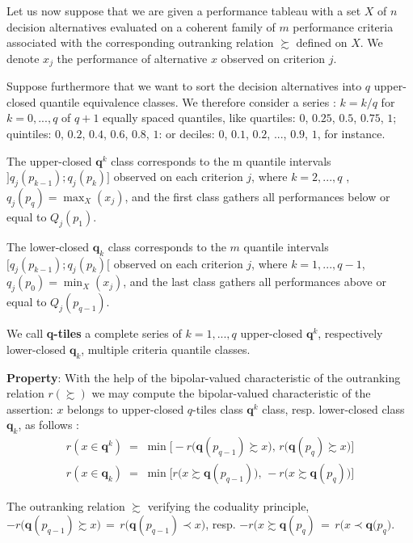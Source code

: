 Let us now suppose that we are given a performance tableau with a set $X$ of $n$ decision alternatives evaluated on a coherent family of $m$ performance criteria associated with the corresponding outranking relation $\succsim$ defined on $X$. We denote $x_j$ the performance of alternative $x$ observed on criterion $j$.

Suppose furthermore that we want to sort the decision alternatives into $q$ upper-closed quantile equivalence classes. We therefore consider a series : $k = k/q$ for $k = 0, ..., q$ of $q+1$ equally spaced quantiles, like quartiles: $0$, $0.25$, $0.5$, $0.75$, $1$; quintiles: $0$, $0.2$, $0.4$, $0.6$, $0.8$, $1$: or deciles: $0$, $0.1$, $0.2$, ..., $0.9$, $1$, for instance.

The upper-closed $\mathbf{q}^k$ class corresponds to the m quantile intervals $]q_j(p_{k-1});q_j(p_k)]$ observed on each criterion $j$,  where $k = 2, ..., q$ , $q_j(p_q) =  \max_X(x_j)$, and the first class gathers all performances below or equal to $Q_j(p_1)$.

The lower-closed $\mathbf{q}_k$ class corresponds to the $m$ quantile intervals $[q_j(p_{k-1});q_j(p_k)[$ observed on each criterion $j$, where $k = 1, ..., q-1$, $q_j(p_0) = \min_X(x_j)$, and the last class gathers all performances above or equal to $Q_j(p_{q-1})$.

We call \textbf{q-tiles} a complete series of $k = 1, ..., q$ upper-closed $\mathbf{q}^k$, respectively lower-closed $\mathbf{q}_k$, multiple criteria quantile classes.

\textbf{Property}: With the help of the bipolar-valued characteristic of the outranking relation $r(\succsim)$ we may compute the bipolar-valued characteristic of the assertion: $x$ belongs to upper-closed $q$-tiles class $\mathbf{q}^k$ class, resp. lower-closed class $\mathbf{q}_k$, as follows \citep{BIS-2016} :
\begin{eqnarray}\label{eq:9.1}
r(x \in \mathbf{q}^k) \; = \; \min \big[ -r\big(\mathbf{q}(p_{q-1}) \succsim x\big), \,r\big(\mathbf{q}(p_{q}) \succsim x)\big]\\
r(x \in \mathbf{q}_k) \; = \; \min \big[ r\big(x \succsim \mathbf{q}(p_{q-1})\big),\, -r\big(x \succsim\mathbf{q}(p_{q})\big)\big]
\end{eqnarray}

The outranking relation $\succsim$ verifying the coduality principle, $-r\big(\mathbf{q}(p_{q-1}) \succsim x\big) \,=\, r\big(\mathbf{q}(p_{q-1}) \prec x\big)$, resp. $-r\big(x \succsim \mathbf{q}(p_{q}) \,=\, r\big(x \prec \mathbf{q}(p_{q}\big)$.

